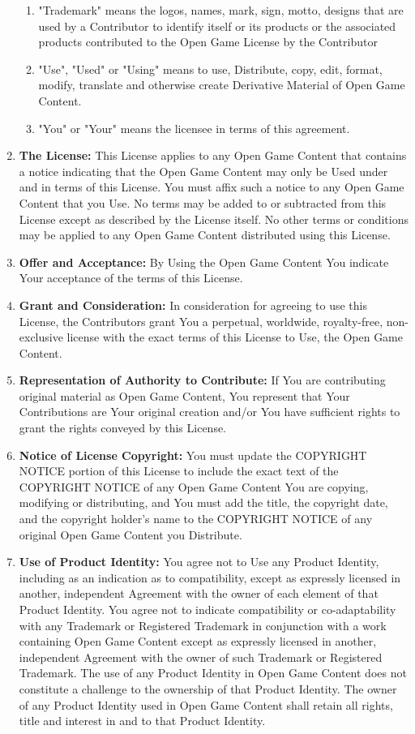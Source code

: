 \begin{enumerate}
\begin{enumerate}
 \item "Trademark" means the logos, names, mark, sign, motto, designs that are used by a Contributor to identify itself or its products or the associated products contributed to the Open Game License by the Contributor
 \item "Use", "Used" or "Using" means to use, Distribute, copy, edit, format, modify, translate and otherwise create Derivative Material of Open Game Content. 
 \item "You" or "Your" means the licensee in terms of this agreement.
\end{enumerate}
 \item \textbf{The License:} This License applies to any Open Game Content that contains a notice indicating that the Open Game Content may only be Used under and in terms of this License. You must affix such a notice to any Open Game Content that you Use. No terms may be added to or subtracted from this License except as described by the License itself. No other terms or conditions may be applied to any Open Game Content distributed using this License.
 \item \textbf{Offer and Acceptance:} By Using the Open Game Content You indicate Your acceptance of the terms of this License.
 \item \textbf{Grant and Consideration:} In consideration for agreeing to use this License, the Contributors grant You a perpetual, worldwide, royalty-free, non-exclusive license with the exact terms of this License to Use, the Open Game Content.
 \item \textbf{Representation of Authority to Contribute:} If You are contributing original material as Open Game Content, You represent that Your Contributions are Your original creation and/or You have sufficient rights to grant the rights conveyed by this License.
 \item \textbf{Notice of License Copyright:} You must update the COPYRIGHT NOTICE portion of this License to include the exact text of the COPYRIGHT NOTICE of any Open Game Content You are copying, modifying or distributing, and You must add the title, the copyright date, and the copyright holder's name to the COPYRIGHT NOTICE of any original Open Game Content you Distribute.
 \item \textbf{Use of Product Identity:} You agree not to Use any Product Identity, including as an indication as to compatibility, except as expressly licensed in another, independent Agreement with the owner of each element of that Product Identity. You agree not to indicate compatibility or co-adaptability with any Trademark or Registered Trademark in conjunction with a work containing Open Game Content except as expressly licensed in another, independent Agreement with the owner of such Trademark or Registered Trademark. The use of any Product Identity in Open Game Content does not constitute a challenge to the ownership of that Product Identity. The owner of any Product Identity used in Open Game Content shall retain all rights, title and interest in and to that Product Identity.

\end{enumerate}
